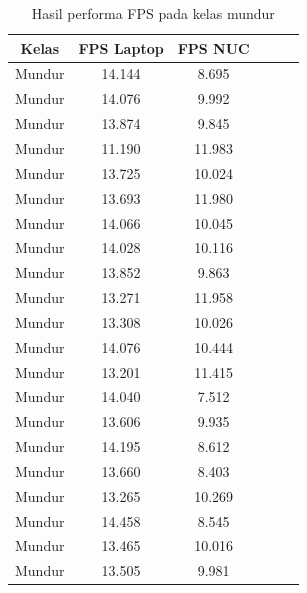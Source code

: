 \begin{longtable}{|c|c|c|c|c|c|}
  \caption{Hasil performa FPS pada kelas mundur}
  \label{tb:fpsmundur} \\
  \hline
  \rowcolor[HTML]{C0C0C0} 
  \textbf{Kelas} & \textbf{FPS Laptop} & \textbf{FPS NUC} \\ \hline
  Mundur         & 14.144              & 8.695            \\ \hline
  Mundur         & 14.076              & 9.992            \\ \hline
  Mundur         & 13.874              & 9.845            \\ \hline
  Mundur         & 11.190              & 11.983           \\ \hline
  Mundur         & 13.725              & 10.024           \\ \hline
  Mundur         & 13.693              & 11.980           \\ \hline
  Mundur         & 14.066              & 10.045           \\ \hline
  Mundur         & 14.028              & 10.116           \\ \hline
  Mundur         & 13.852              & 9.863            \\ \hline
  Mundur         & 13.271              & 11.958           \\ \hline
  Mundur         & 13.308              & 10.026           \\ \hline
  Mundur         & 14.076              & 10.444           \\ \hline
  Mundur         & 13.201              & 11.415           \\ \hline
  Mundur         & 14.040              & 7.512            \\ \hline
  Mundur         & 13.606              & 9.935            \\ \hline
  Mundur         & 14.195              & 8.612            \\ \hline
  Mundur         & 13.660              & 8.403            \\ \hline
  Mundur         & 13.265              & 10.269           \\ \hline
  Mundur         & 14.458              & 8.545            \\ \hline
  Mundur         & 13.465              & 10.016           \\ \hline
  Mundur         & 13.505              & 9.981            \\ \hline

\end{longtable}
